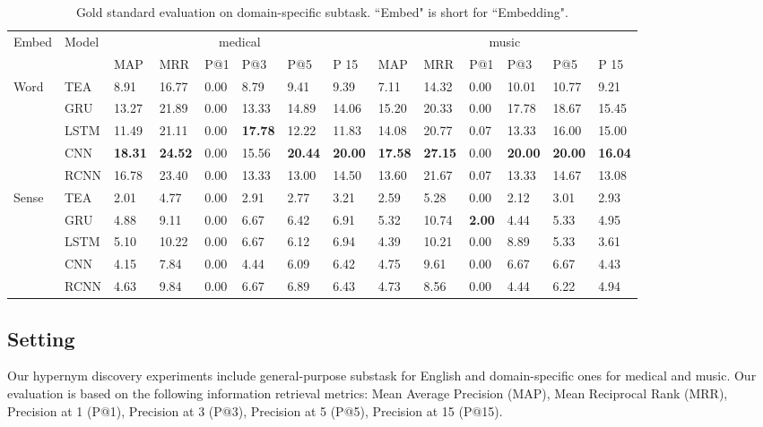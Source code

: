 \documentclass[11pt,a4paper]{article}
\begin{document}
\begin{table*}[t]\centering
\small {
	\begin{tabular}{l|l|l|l|l|l|l|l|l|l|l|l|l|l}
		\hline
		\hline
		\multirow{2}{*}{Embed} & \multirow{2}{*}{Model}   & \multicolumn{6}{c|}{medical} & \multicolumn{6}{c}{music} \\
		\cline{3-14}
		& &MAP  &  MRR  & P@1 & P@3 & P@5 & P 15  & MAP  &  MRR  & P@1 & P@3 & P@5 & P 15\\
		\hline
		\multirow{4}{*}{Word} 
		& TEA  &  8.91  &  16.77 &  0.00 &  8.79  &  9.41  &  9.39   &
		7.11  &  14.32 &  0.00 &  10.01  & 10.77 &  9.21  \\
		& GRU  &  13.27 &  21.89 &  0.00 &  13.33 &  14.89 &  14.06  &  15.20 &  20.33 &  0.00 &  17.78 &  18.67 &  15.45  \\
		& LSTM &  11.49 &  21.11 &  0.00 &  \textbf{17.78} &  12.22 &  11.83  &  14.08 &  20.77 &  0.07 &  13.33 &  16.00 &  15.00  \\
		& CNN  &  \textbf{18.31} &  \textbf{24.52} &  0.00 &  15.56 &  \textbf{20.44} &  \textbf{20.00}&  \textbf{17.58} &  \textbf{27.15} &  0.00 &  \textbf{20.00} &  \textbf{20.00} &  \textbf{16.04}  \\
		& RCNN &  16.78 &  23.40 &  0.00 &  13.33 &  13.00 &  14.50  &  13.60 &  21.67 &  0.07 &  13.33 &  14.67 &  13.08  \\
		\hline
		\multirow{4}{*}{Sense}
		& TEA  &  2.01 &  4.77 &  0.00 &  2.91 &  2.77 &  3.21  & 2.59 &
		5.28  & 0.00 &  2.12  & 3.01  &  2.93 \\
		& GRU  &  4.88 &  9.11 &  0.00 &  6.67 &  6.42 &  6.91  & 5.32 &  10.74 &  \textbf{2.00} &  4.44 &  5.33 &  4.95  \\
		& LSTM &  5.10 &  10.22 &  0.00 &  6.67 &  6.12 &  6.94  & 4.39 &  10.21 &  0.00 &  8.89 &  5.33 &  3.61  \\
		& CNN  &  4.15 &  7.84 &  0.00 &  4.44 &  6.09 &  6.42  & 4.75 &  9.61 &  0.00 &  6.67 &  6.67 &  4.43 \\
		& RCNN &  4.63 &  9.84 &  0.00 &  6.67 &  6.89 &  6.43  & 4.73 &  8.56 &  0.00 &  4.44 &  6.22 &  4.94  \\
		\hline
		\hline
	\end{tabular}
	
}
\caption{\label{tab:result_domain} Gold standard
	evaluation on domain-specific subtask. ``Embed" is short for ``Embedding".}
\end{table*}

\subsection{Setting}
Our hypernym discovery experiments include general-purpose substask for English and domain-specific ones for medical and music. Our evaluation is based on the following information retrieval metrics: Mean Average Precision (MAP), Mean Reciprocal Rank (MRR), Precision at 1 (P@1), Precision at 3 (P@3), Precision at 5 (P@5), Precision at 15 (P@15).
\end{document}
